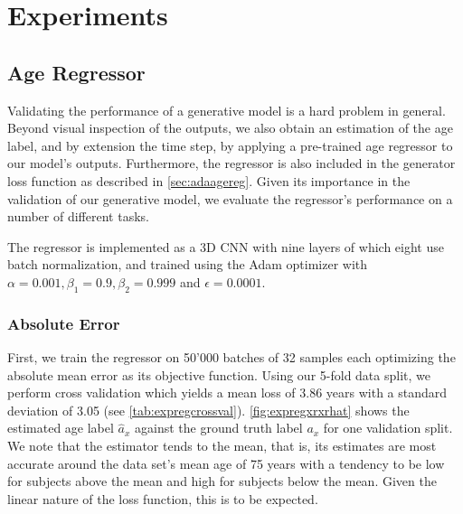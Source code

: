 \chapter{Experiments}

\section{Age Regressor}
\label{sec:expreg}
Validating the performance of a generative model is a hard problem in general. Beyond visual inspection of the outputs, we also obtain an estimation of the age label, and by extension the time step, by applying a pre-trained age regressor to our model's outputs. Furthermore, the regressor is also included in the generator loss function as described in \autoref{sec:adaagereg}. Given its importance in the validation of our generative model, we evaluate the regressor's performance on a number of different tasks.

The regressor is implemented as a 3D CNN with nine layers of which eight use batch normalization, and trained using the Adam optimizer with $\alpha = 0.001, \beta_1 = 0.9, \beta_2 = 0.999 $ and $ \epsilon = 0.0001 $.

\subsection*{Absolute Error}
First, we train the regressor on 50'000 batches of 32 samples each optimizing the absolute mean error as its objective function. Using our 5-fold data split, we perform cross validation which yields a mean loss of 3.86 years with a standard deviation of 3.05 (see \autoref{tab:expregcrossval}). \autoref{fig:expregxrxrhat} shows the estimated age label $ \hat a_x $ against the ground truth label $a_x$ for one validation split. We note that the estimator tends to the mean, that is, its estimates are most accurate around the data set's mean age of 75 years with a tendency to be low for subjects above the mean and high for subjects below the mean. Given the linear nature of the loss function, this is to be expected.

